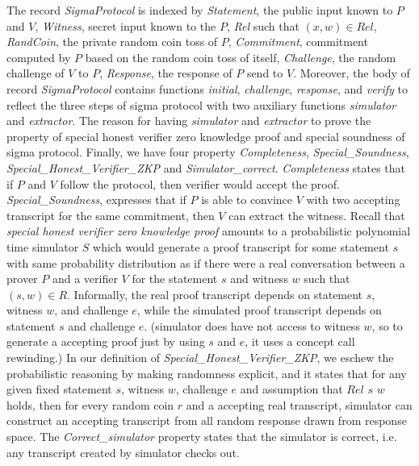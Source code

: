 \noindent
The record \textit{SigmaProtocol} is indexed by \textit{Statement}, the public input 
known to $P$ and $V$, \textit{Witness}, secret input known to the $P$, 
\textit{Rel} such that $(x, w) \in Rel$, \textit{RandCoin}, the private 
random coin toss of $P$, \textit{Commitment}, commitment computed 
by $P$ based on the random coin toss of itself, 
\textit{Challenge}, the random challenge of $V$ to $P$, 
\textit{Response}, the response of $P$ send to $V$. Moreover, 
the body of record \textit{SigmaProtocol} contains
functions \textit{initial}, \textit{challenge}, \textit{response}, and \textit{verify}
to reflect the three steps of sigma protocol with two auxiliary 
functions \textit{simulator} and \textit{extractor}.  The 
reason for having \textit{simulator} and \textit{extractor} 
to prove the property of special honest verifier zero knowledge proof 
and special soundness of 
sigma protocol. Finally, we have four property \textit{Completeness}, 
\textit{Special\_Soundness}, \textit{Special\_Honest\_Verifier\_ZKP}
and \textit{Simulator\_correct}. 
\textit{Completeness} states that if $P$ and $V$ follow the protocol, then 
verifier would accept the proof. \textit{Special\_Soundness},
expresses that if $P$ is able to convince $V$ with two 
accepting transcript for the same commitment, then $V$ can extract the witness.
Recall that \textit{special honest 
verifier zero knowledge proof} amounts to a probabilistic polynomial time simulator 
$S$ which would generate a proof transcript for some statement 
$s$  with same probability distribution as if there were a real 
conversation between a prover $P$ and a verifier $V$ 
for the statement $s$ and witness $w$ such that $(s, w) \in  R$.
Informally, the real proof transcript depends on statement $s$, witness $w$,  
and challenge $e$, 
while the simulated proof transcript depends on statement $s$ and challenge $e$. 
(simulator does have not access to witness $w$, so to generate a accepting 
proof just by using $s$ and $e$, it uses a concept call rewinding.)
In our definition of \textit{Special\_Honest\_Verifier\_ZKP}, we eschew the 
probabilistic reasoning by making randomness explicit, and it
states that for any  given 
fixed statement $s$, witness $w$, challenge $e$ and assumption that $Rel$ $s$ $w$ holds, 
then for every random coin $r$  and a accepting real transcript, simulator can construct 
an accepting transcript from all random response drawn from response space. 
The \textit{Correct\_simulator} property states that the simulator is correct, i.e.
any transcript created by simulator checks out. 



